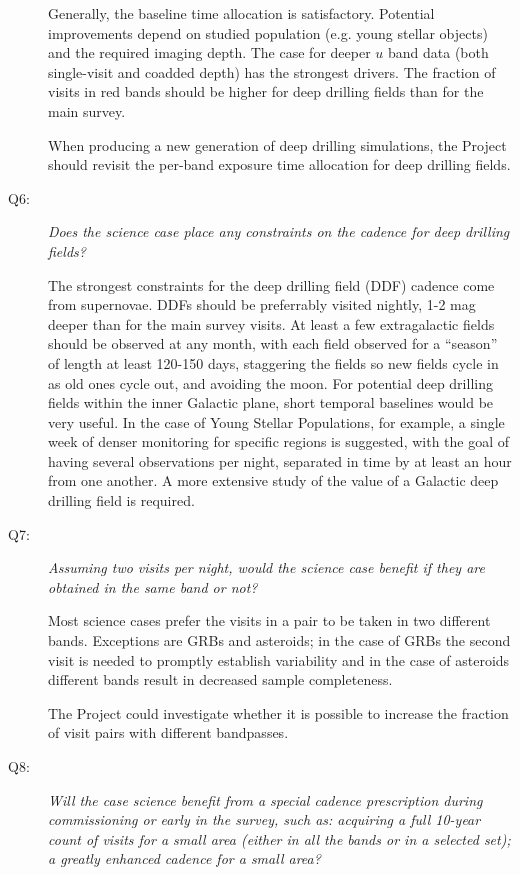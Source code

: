 \begin{description}
Generally, the baseline time allocation is satisfactory. Potential
improvements depend on studied population (e.g. young stellar objects)
and the required imaging depth.
The case for deeper $u$ band data (both single-visit and coadded depth)
has the strongest drivers. The fraction of visits in red bands should be
higher for deep drilling fields than for the main survey.

When producing a new generation of deep drilling simulations, the
Project should revisit the per-band exposure time allocation for deep
drilling fields.


\item[Q6:] {\it Does the science case place any constraints on the
cadence for deep drilling fields?}

The strongest constraints for the deep drilling field (DDF) cadence come
from supernovae. DDFs should be preferrably visited nightly,
1-2 mag deeper than for the main survey visits. At least a few
extragalactic fields should be observed at any month, with
each field observed for a ``season'' of length at least 120-150 days,
staggering the fields so new fields cycle in as old ones cycle out, and
avoiding the moon. For
potential deep drilling fields within the inner Galactic plane, short
temporal baselines would be very useful. In the case of Young Stellar
Populations, for example, a single week of denser monitoring for specific regions is
suggested, with the goal of having several observations per night,
separated in time by at least an hour from one another. A more extensive study of the value of a Galactic deep drilling field is required.


\item[Q7:] {\it Assuming two visits per night, would the science case
benefit if they are obtained in the same band or not?}

Most science cases prefer the visits in a pair to be taken in two different bands.
Exceptions are GRBs and asteroids; in the case of GRBs the second visit is
needed to promptly establish variability and in the case of asteroids
different bands result in decreased sample completeness.

The Project could investigate whether it is possible to increase the
fraction of visit pairs with different bandpasses.


\item[Q8:] {\it Will the case science benefit from a special cadence
prescription during commissioning or early in the survey, such as:
acquiring a full 10-year count of visits for a small area (either in all
the bands or in a  selected set); a greatly enhanced cadence for a small
area?}


\end{description}

